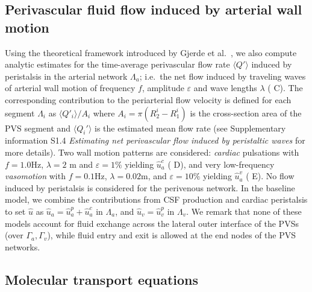 \documentclass[fleqn,10pt]{wlscirep}
\providecommand{\DIFadd}[1]{{\protect\color{blue}\uwave{#1}}} %
\providecommand{\DIFaddbegin}{} %
\providecommand{\DIFaddend}{} %
\begin{document}
\DIFaddend %

\subsection*{Perivascular fluid flow induced by arterial wall motion}

Using the theoretical framework introduced by Gjerde et
al.~\cite{gjerde2023directional}, we also compute analytic estimates
for the time-average perivascular flow rate $\langle Q' \rangle$
induced by peristalsis in the arterial network $\Lambda_a$; i.e.~the
net flow induced by traveling waves of arterial wall motion of
frequency $f$, amplitude $\varepsilon$ and wave lengths $\lambda$
( \DIFaddbegin \DIFadd{\mbox{%
\Cref{fig:pvs}}\hskip0pt%
}\DIFaddend C). The corresponding contribution to the
periarterial flow velocity is defined for each segment $\Lambda_i$ as
$\langle Q'_i \rangle/A_i$ where $A_i = \pi (R_2^i - R_1^i)$ is the
cross-section area of the PVS segment and $\langle Q_i' \rangle$ is
the estimated mean flow rate (see Supplementary information S1.4
\emph{Estimating net perivascular flow induced by peristaltic waves}
for more details). Two wall motion patterns are considered:
\emph{cardiac} pulsations with $f = 1.0$Hz, $\lambda = 2$ m and
$\varepsilon = 1\%$ yielding $\hat{u}_a^c$ ( \DIFaddbegin \DIFadd{\mbox{%
\Cref{fig:pvs}}\hskip0pt%
}\DIFaddend D), and
very low-frequency \emph{vasomotion} with $f = 0.1$Hz, $\lambda =
0.02$m, and $\varepsilon = 10\%$ yielding $\hat{u}_a^v$
( \DIFaddbegin \DIFadd{\mbox{%
\Cref{fig:pvs}}\hskip0pt%
}\DIFaddend E). No flow induced by peristalsis is considered for
the perivenous network. In the baseline model, we combine the
contributions from CSF production and cardiac peristalsis to set
$\hat{u}$ as $\hat{u}_a = \hat{u}_a^p + \hat{u}_a^c$ in $\Lambda_a$,
and $\hat{u}_v = \hat{u}_v^p$ in $\Lambda_v$. We remark that none of
these models account for fluid exchange across the lateral outer
interface of the PVSs (over $\Gamma_a, \Gamma_v$), while fluid entry
and exit is allowed at the end nodes of the PVS networks.

\subsection*{Molecular transport equations}
\end{document}
